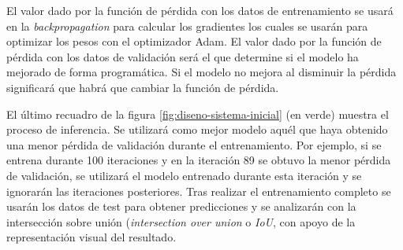 


El valor dado por la función de pérdida con los datos de entrenamiento se usará en la \textit{backpropagation} para calcular los gradientes los cuales se usarán para optimizar los pesos con el optimizador Adam. El valor dado por la función de pérdida con los datos de validación será el que determine si el modelo ha mejorado de forma programática. Si el modelo no mejora al disminuir la pérdida significará que habrá que cambiar la función de pérdida.

El último recuadro de la figura \ref{fig:diseno-sistema-inicial} (en verde) muestra el proceso de inferencia. Se utilizará como mejor modelo aquél que haya obtenido una menor pérdida de validación durante el entrenamiento. Por ejemplo, si se entrena durante 100 iteraciones y en la iteración 89 se obtuvo la menor pérdida de validación, se utilizará el modelo entrenado durante esta iteración y se ignorarán las iteraciones posteriores. Tras realizar el entrenamiento completo se usarán los datos de test para obtener predicciones y se analizarán con la intersección sobre unión (\textit{intersection over union} o \textit{IoU}, con apoyo de la representación visual del resultado.

